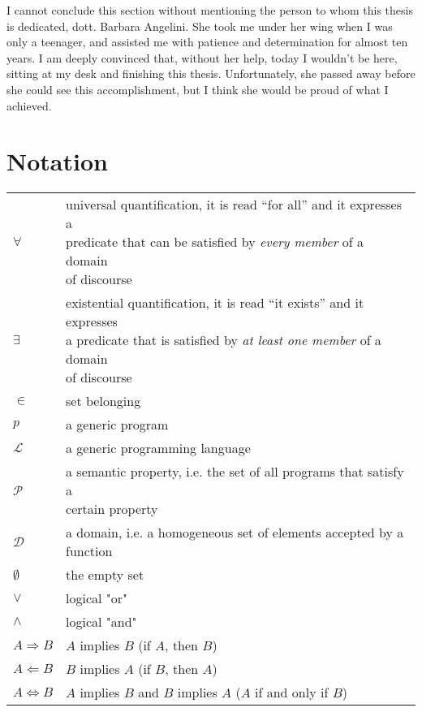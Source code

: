 \documentclass[target=mst,aauheader=aics]{thud}
\theoremstyle{definition}
\begin{document}
	I cannot conclude this section without mentioning the person to whom this thesis is dedicated, dott. Barbara Angelini. She took me under her wing when I was only a teenager, and assisted me with patience and determination for almost ten years. I am deeply convinced that, without her help, today I wouldn't be here, sitting at my desk and finishing this thesis. Unfortunately, she passed away before she could see this accomplishment, but I think she would be proud of what I achieved. 
	
	
	\tableofcontents
	
	\mainmatter
	
	\chapter*{Notation}\label{chapter:notation}
	
	\renewcommand{\arraystretch}{2.0}
	\setlength{\tabcolsep}{25pt}
	\begin{tabular}{l l}
		$\forall$ & \makecell[l]{universal quantification, it is read ``for all'' and it expresses a \\predicate that can be satisfied by \textit{every member} of a domain\\ of discourse} \\
		$\exists$ & \makecell[l]{existential quantification, it is read ``it exists'' and it expresses \\a predicate that is satisfied by \textit{at least one member} of a domain\\ of discourse} \\
		$\in$ & set belonging \\
		$p$ & a generic program \\
		$\mathcal{L}$ & a generic programming language \\
		$\mathcal{P}$ & \makecell[l]{a semantic property, i.e. the set of all programs that satisfy a\\certain property} \\
		$\mathcal{D}$ & a domain, i.e. a homogeneous set of elements accepted by a function\\
		$\emptyset$ & the empty set \\
		$\vee$ & logical "or"\\
		$\wedge$ & logical "and"\\
		$A \Longrightarrow B$ & $A$ implies $B$ (if $A$, then $B$)\\
		$A \Longleftarrow B$ & $B$ implies $A$ (if $B$, then $A$)\\
		$A \Longleftrightarrow B$& $A$ implies $B$ and $B$ implies $A$ ($A$ if and only if $B$)\\
	\end{tabular}
	
\end{document}

